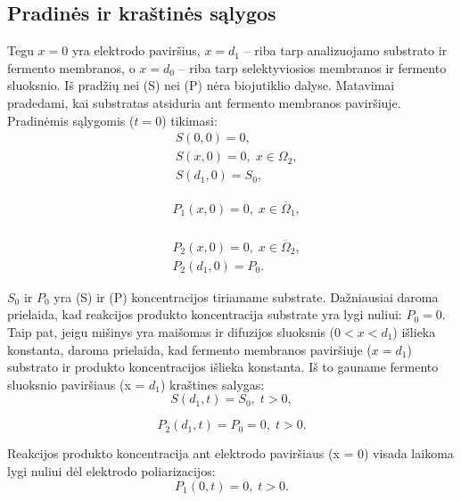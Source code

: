 \documentclass[12pt, a4paper, lithuanian]{article}
\begin{document}
\subsection{Pradinės ir kraštinės sąlygos}
Tegu $x = 0$ yra elektrodo paviršius, $x = d_1$ – riba tarp analizuojamo
substrato ir fermento membranos, o $x = d_0$ – riba tarp selektyviosios membranos
ir fermento sluoksnio. Iš pradžių nei (S) nei (P) nėra biojutiklio
dalyse. Matavimai pradedami, kai substratas atsiduria ant fermento membranos
paviršiuje. Pradinėmis sąlygomis ($t = 0$) tikimasi:
\begin{equation}
\begin{aligned}
    &S(0,0) = 0, \\
    &S(x, 0) = 0,\; x \in \Omega_2,\\
    &S(d_1, 0) = S_0,
\end{aligned}
\end{equation}

\begin{equation}
\begin{aligned}
    &P_1(x, 0) = 0,\; x \in \overline\Omega_1,\\
\end{aligned}
\end{equation}

\begin{equation}
\begin{aligned}
    &P_2(x, 0) = 0,\; x \in \overline\Omega_2,\\
    &P_2(d_1, 0) = P_0.
\end{aligned}
\end{equation}

$S_0$ ir $P_0$ yra (S) ir (P) koncentracijos tiriamame substrate. Dažniausiai
daroma prielaida, kad reakcijos produkto koncentracija substrate yra lygi nuliui:
$P_0 = 0$. Taip pat, jeigu mišinys yra maišomas ir difuzijos sluoksnis ($0 < x <
d_1$) išlieka konstanta, daroma prielaida, kad fermento membranos paviršiuje
($x = d_1$) substrato ir produkto koncentracijos išlieka konstanta. Iš to gauname fermento sluoksnio paviršiaus (x = $d_1$) kraštines salygas:
\begin{equation} 
    S(d_1, t) = S_0,\; t>0,
\end{equation}

\begin{equation} 
    P_2(d_1, t) = P_0 = 0,\; t>0.
\end{equation}

Reakcijos produkto koncentracija ant elektrodo paviršiaus (x = 0) visada
laikoma lygi nuliui dėl elektrodo poliarizacijos:
\begin{equation} 
    P_1(0,t)=0, \; t>0.
\end{equation}
\end{document}
